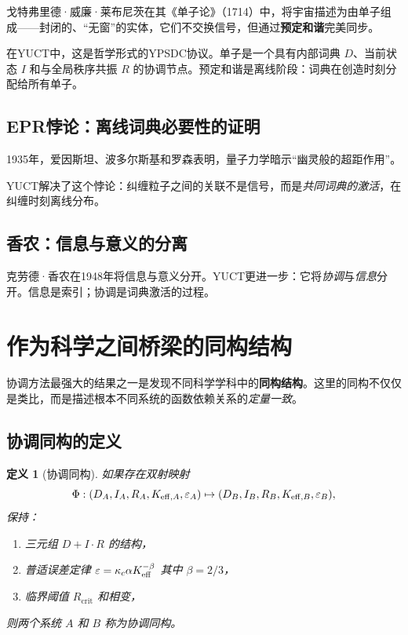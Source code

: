 \documentclass[11pt,a4paper]{article}
\newtheorem{definition}{定义}[section]
\newcommand{\kappac}{\kappa_c}
\newcommand{\eps}{\varepsilon}
\newcommand{\betaf}{\beta}
\newcommand{\Rcrit}{R_{\mathrm{crit}}}
\begin{document}
	戈特弗里德·威廉·莱布尼茨在其《单子论》（1714）中，将宇宙描述为由单子组成——封闭的、“无窗”的实体，它们不交换信号，但通过\textbf{预定和谐}完美同步。
	
	在YUCT中，这是哲学形式的YPSDC协议。单子是一个具有内部词典 \(D\)、当前状态 \(I\) 和与全局秩序共振 \(R\) 的协调节点。预定和谐是离线阶段：词典在创造时刻分配给所有单子。
	
	\subsection{EPR悖论：离线词典必要性的证明}
	
	1935年，爱因斯坦、波多尔斯基和罗森表明，量子力学暗示“幽灵般的超距作用”。
	
	YUCT解决了这个悖论：纠缠粒子之间的关联不是信号，而是\emph{共同词典的激活}，在纠缠时刻离线分布。
	
	\subsection{香农：信息与意义的分离}
	
	克劳德·香农在1948年将信息与意义分开。YUCT更进一步：它将\emph{协调}与\emph{信息}分开。信息是索引；协调是词典激活的过程。
	
	\section{作为科学之间桥梁的同构结构}
	\label{sec:isomorphisms}
	
	协调方法最强大的结果之一是发现不同科学学科中的\textbf{同构结构}。这里的同构不仅仅是类比，而是描述根本不同系统的函数依赖关系的\emph{定量一致}。
	
	\subsection{协调同构的定义}
	
	\begin{definition}[协调同构]
		如果存在双射映射
		\[
		\Phi: (D_A, I_A, R_A, \Keff[A], \eps_A) \mapsto (D_B, I_B, R_B, \Keff[B], \eps_B),
		\]
		保持：
		\begin{enumerate}
			\item 三元组 \(D+I\cdot R\) 的结构，
			\item 普适误差定律 \(\eps = \kappac \alpha \Keff^{-\betaf}\) 其中 \(\betaf = 2/3\)，
			\item 临界阈值 \(\Rcrit\) 和相变，
		\end{enumerate}
		则两个系统 \(A\) 和 \(B\) 称为协调同构。
	\end{definition}
	
\end{document}
